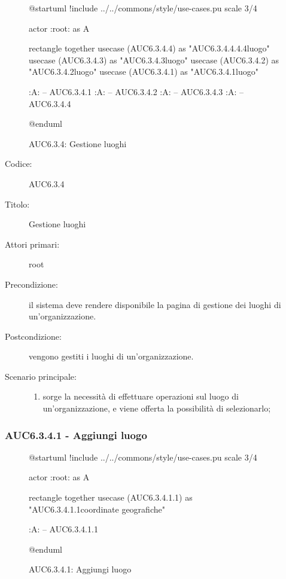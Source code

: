 \documentclass[casi-duso]{subfiles}
\begin{document}
\begin{figure}[h!] 
  \centering 
  \begin{plantuml}
  @startuml
  !include ../../commons/style/use-cases.pu
  scale 3/4

  actor :root: as A

  rectangle {
    together {
      usecase (AUC6.3.4.4) as "AUC6.3.4.4.4.4\nSeleziona luogo"
      usecase (AUC6.3.4.3) as "AUC6.3.4.3\nModifica luogo"
      usecase (AUC6.3.4.2) as "AUC6.3.4.2\nEliminazione luogo"
      usecase (AUC6.3.4.1) as "AUC6.3.4.1\nAggiungi luogo"
    }
  }

  :A: -- AUC6.3.4.1
  :A: -- AUC6.3.4.2
  :A: -- AUC6.3.4.3
  :A: -- AUC6.3.4.4

  @enduml
  \end{plantuml} 
  \caption{AUC6.3.4: Gestione luoghi} 
  \label{fig:auc6_3_4} 
\end{figure}

\begin{description}
  \item[Codice:] AUC6.3.4
  \item[Titolo:] Gestione luoghi
  \item[Attori primari:] root
  \item[Precondizione:] il sistema deve rendere disponibile la pagina di gestione dei luoghi di un'organizzazione.
  \item[Postcondizione:] vengono gestiti i luoghi di un'organizzazione.
  \item[Scenario principale:]
  \begin{enumerate}
    \item sorge la necessità di effettuare operazioni sul luogo di un'organizzazione, e viene offerta la possibilità di selezionarlo;
  \end{enumerate}
\end{description}

\subsubsection{AUC6.3.4.1 - Aggiungi luogo}%
\label{subsub:AUC6.3.4.1}

\begin{figure}[h!] 
  \centering 
  \begin{plantuml}
  @startuml 
  !include ../../commons/style/use-cases.pu
  scale 3/4

  actor :root: as A

  rectangle {
    together {
      usecase (AUC6.3.4.1.1) as "AUC6.3.4.1.1\nInserisci coordinate geografiche"
    }
  }

  :A: -- AUC6.3.4.1.1

  @enduml
  \end{plantuml} 
  \caption{AUC6.3.4.1: Aggiungi luogo} 
  \label{fig:auc6_3_4_1} 
\end{figure}
\end{document}
